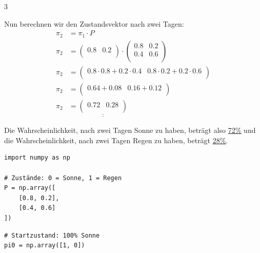 \begin{landscape}
\begin{multicols*}{3}
\begin{cheatSheetBox}[title=Vorhersage von Zuständen]
      Nun berechnen wir den Zustandsvektor nach zwei Tagen:
      \[\begin{aligned}
          \pi_2 & = \pi_1 \cdot P                                       \\
          \pi_2 & =
          \begin{pmatrix}
            0.8 & 0.2 \\
          \end{pmatrix}
          \cdot
          \begin{pmatrix}
            0.8 & 0.2 \\
            0.4 & 0.6 \\
          \end{pmatrix}                                                \\
          \pi_2 & =
          \begin{pmatrix}
            0.8 \cdot 0.8 + 0.2 \cdot 0.4 & 0.8 \cdot 0.2 + 0.2 \cdot 0.6 \\
          \end{pmatrix} \\
          \pi_2 & =
          \begin{pmatrix}
            0.64 + 0.08 & 0.16 + 0.12 \\
          \end{pmatrix}                                     \\
          \pi_2 & =
          \underline{\underline{
              \begin{pmatrix}
                0.72 & 0.28 \\
              \end{pmatrix}
            }}
        \end{aligned}\]

      Die Wahrscheinlichkeit, nach zwei Tagen Sonne zu haben, beträgt also \underline{\underline{72\%}} und die Wahrscheinlichkeit, nach zwei Tagen Regen zu haben, beträgt \underline{\underline{28\%}}.
    \end{cheatSheetBox}

    \begin{cheatSheetBox}[title=Python: Erstellung der Übergangsmatrix]
      \begin{lstlisting}
import numpy as np

# Zustände: 0 = Sonne, 1 = Regen
P = np.array([
    [0.8, 0.2],
    [0.4, 0.6]
])
\end{lstlisting}
    \end{cheatSheetBox}
    \begin{cheatSheetBox}[title=Python: Vorhersage von Zuständen]
      \begin{lstlisting}
# Startzustand: 100% Sonne
pi0 = np.array([1, 0])


\end{lstlisting}
\end{cheatSheetBox}
\end{multicols*}
\end{landscape}
